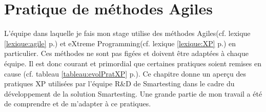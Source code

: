 \chapter{Pratique de méthodes Agiles}\label{agile}
L'équipe dans laquelle je fais mon stage utilise des méthodes Agiles(cf. lexique \ref{lexique:agile} p.\pageref{lexique:agile}) et eXtreme Programming(cf. lexique \ref{lexique:XP} p.\pageref{lexique:XP}) en particulier. Ces méthodes ne sont pas figées et doivent être adaptées à chaque équipe. Il est donc courant et primordial que certaines pratiques soient remises en cause (cf. tableau \ref{tableau:evolPratXP} p.\pageref{tableau:evolPratXP}). Ce chapitre donne un aperçu des pratiques XP utilisées par l'équipe R\&D de Smartesting dans le cadre du développement de la solution Smartesting. Une grande partie de mon travail a été de comprendre et de m'adapter à ce pratiques. 
